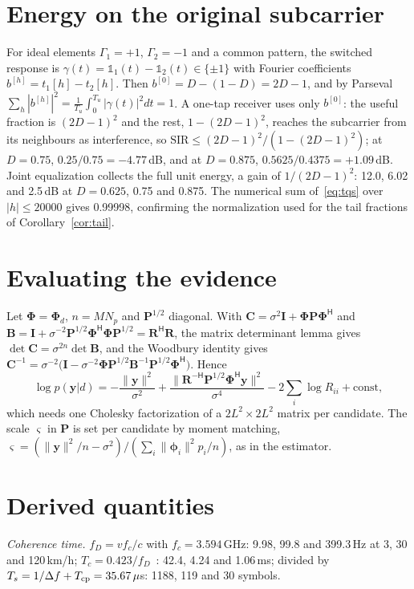 \section{Energy on the original subcarrier}\label{app:parseval}
For ideal elements $\Gamma_1=+1$, $\Gamma_2=-1$ and a common pattern, the switched response is
$\gamma(t)=\mathbb 1_1(t)-\mathbb 1_2(t)\in\{\pm1\}$ with Fourier coefficients
$b^{[h]}=t_1[h]-t_2[h]$. Then $b^{[0]}=D-(1-D)=2D-1$, and by Parseval
$\sum_h|b^{[h]}|^2=\frac1{T_u}\int_0^{T_u}|\gamma(t)|^2dt=1$. A one-tap receiver uses only $b^{[0]}$:
the useful fraction is $(2D-1)^2$ and the rest, $1-(2D-1)^2$, reaches the subcarrier from its
neighbours as interference, so $\mathrm{SIR}\le(2D-1)^2/(1-(2D-1)^2)$; at $D=0.75$,
$0.25/0.75=-4.77$\,dB, and at $D=0.875$, $0.5625/0.4375=+1.09$\,dB. Joint equalization collects
the full unit energy, a gain of $1/(2D-1)^2$: 12.0, 6.02 and 2.5\,dB at $D=0.625$, 0.75 and 0.875.
The numerical sum of~\eqref{eq:tqs} over $|h|\le20000$ gives 0.99998, confirming the normalization
used for the tail fractions of Corollary~\ref{cor:tail}.

\section{Evaluating the evidence}\label{app:evidence}
Let $\bm\Phi=\bm\Phi_d$, $n=MN_p$ and $\bm P^{1/2}$ diagonal. With
$\bm C=\sigma^2\bm I+\bm\Phi\bm P\bm\Phi^{\mathsf H}$ and $\bm B=\bm I+\sigma^{-2}\bm P^{1/2}\bm\Phi^{\mathsf H}\bm\Phi\bm P^{1/2}=\bm R^{\mathsf H}\bm R$,
the matrix determinant lemma gives $\det\bm C=\sigma^{2n}\det\bm B$, and the Woodbury identity gives
$\bm C^{-1}=\sigma^{-2}\big(\bm I-\sigma^{-2}\bm\Phi\bm P^{1/2}\bm B^{-1}\bm P^{1/2}\bm\Phi^{\mathsf H}\big)$. Hence
\begin{equation}
\log p(\bm y|d)=-\frac{\|\bm y\|^2}{\sigma^2}+\frac{\|\bm R^{-\mathsf H}\bm P^{1/2}\bm\Phi^{\mathsf H}\bm y\|^2}{\sigma^4}-2\sum_i\log R_{ii}+\text{const},
\end{equation}
which needs one Cholesky factorization of a $2L^2\times2L^2$ matrix per candidate. The scale
$\varsigma$ in $\bm P$ is set per candidate by moment matching,
$\varsigma=(\|\bm y\|^2/n-\sigma^2)/(\sum_i\|\bm\phi_i\|^2p_i/n)$, as in the estimator.

\section{Derived quantities}\label{app:derived}
\emph{Coherence time.} $f_D=vf_c/c$ with $f_c=3.594$\,GHz: 9.98, 99.8 and 399.3\,Hz at 3, 30 and
120\,km/h; $T_c=0.423/f_D$~\cite{rappaport2002}: 42.4, 4.24 and 1.06\,ms; divided by
$T_s=1/\Delta f+T_{\rm cp}=35.67\,\mu$s: 1188, 119 and 30 symbols.

